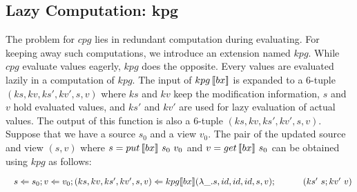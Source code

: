 



\subsection{Lazy Computation: kpg}

The problem for $cpg$ lies in redundant computation during evaluating. For keeping away such computations, we introduce an extension named $kpg$. While $cpg$ evaluate values eagerly, $kpg$ does the opposite. Every values are evaluated lazily in a computation of $kpg$. The input of $kpg \, [\![bx]\!]$ is expanded to a 6-tuple $(ks, kv, ks', kv', s, v)$ where $ks$ and $kv$ keep the modification information, $s$ and $v$ hold evaluated values, and $ks'$ and $kv'$ are used for lazy evaluation of actual values. The output of this function is also a 6-tuple $(ks, kv, ks', kv', s, v)$.\\
Suppose that we have a source $s_0$ and a view $v_0$. The pair of the updated source and view $(s, v)$ where $s = put \, [\![bx]\!] \ s_0 \ v_0$ and $v = get \, [\![bx]\!] \ s_0$ can be obtained using $kpg$ as follows:

    $\tab s \Leftarrow s_0; v \Leftarrow v_0; (ks, kv, ks', kv', s, v) \Leftarrow \kpg{bx}{\lambda \_.s}{id}{id}{id}{s}{v};\\
        \tab \qtab (ks' \ s; kv' \ v)$

